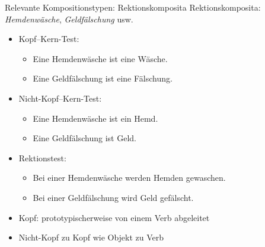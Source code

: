 \begin{frame}
  {Relevante Kompositionstypen: Rektionskomposita}
  \onslide<+->
  Rektionskomposita: \textit{Hemdenwäsche}, \textit{Geldfälschung} usw.
  \Halbzeile
  \begin{itemize}[<+->]
    \item Kopf--Kern-Test:
      \begin{itemize}[<+->]
        \item Eine Hemdenwäsche ist eine Wäsche. \Ck
        \item Eine Geldfälschung ist eine Fälschung. \Ck
      \end{itemize}
    \item Nicht-Kopf--Kern-Test:
      \begin{itemize}[<+->]
        \item Eine Hemdenwäsche ist ein Hemd. \Fl
        \item Eine Geldfälschung ist Geld. \Fl
      \end{itemize}
      \Halbzeile
    \item Rektionstest:
      \begin{itemize}[<+->]
        \item \alert{Bei einer Hemdenwäsche werden Hemden gewaschen. \Ck}
        \item \alert{Bei einer Geldfälschung wird Geld gefälscht. \Ck}
      \end{itemize}
      \Halbzeile
    \item Kopf: prototypischerweise von einem Verb abgeleitet
    \item Nicht-Kopf zu Kopf wie Objekt zu Verb
  \end{itemize}
\end{frame}

